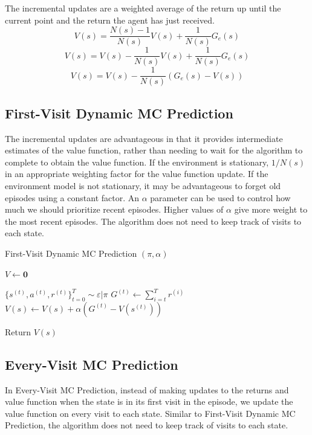 \documentclass[11pt]{article}
\begin{document}
The incremental updates are a weighted average of the return up until the current point and the return the agent has just received. 
$$V(s) = \frac{N(s)-1}{N(s)} V(s) + \frac{1}{N(s)}G_e(s)$$
$$V(s) = V(s) - \frac{1}{N(s)} V(s) + \frac{1}{N(s)}G_e(s)$$
$$V(s) = V(s) - \frac{1}{N(s)} (G_e(s)-V(s))$$


\subsection{First-Visit Dynamic MC Prediction}
The incremental updates are advantageous in that it provides intermediate estimates of the value function, rather than needing to wait for the algorithm to complete to obtain the value function. If the environment is stationary, $1/N(s)$ in an appropriate weighting factor for the value function update. If the environment model is not stationary, it may be advantageous to forget old episodes using a constant factor. An $\alpha$ parameter can be used to control how much we should prioritize recent episodes. Higher values of $\alpha$ give more weight to the most recent episodes. The algorithm does not need to keep track of visits to each state.

\begin{algorithm}[H]
\caption{First-Visit Dynamic MC Prediction $(\pi, \alpha)$}
\label{algo:FVDMC}
\begin{algorithmic}[1]
\STATE $V \leftarrow \mathbf{0}$ \hfill
{}

\STATE $\{s^{(t)}, a^{(t)}, r^{(t)}\}_{t=0}^T \sim \varepsilon|\pi$ \hfill 
{}
\STATE $G^{(t)} \leftarrow \sum_{i=t}^T r^{(i)}$ \hfill 
\STATE $V(s) \leftarrow V(s) + \alpha(G^{(t)}-V(s^{(t)}))$  \hfill
\ENDIF

\ENDFOR
\ENDFOR
\STATE Return $V(s)$  \hfill
\end{algorithmic}
\end{algorithm}


\subsection{Every-Visit MC Prediction}
In Every-Visit MC Prediction, instead of making updates to the returns and value function when the state is in its first visit in the episode, we update the value function on every visit to each state. Similar to First-Visit Dynamic MC Prediction, the algorithm does not need to keep track of visits to each state.
\end{document}
